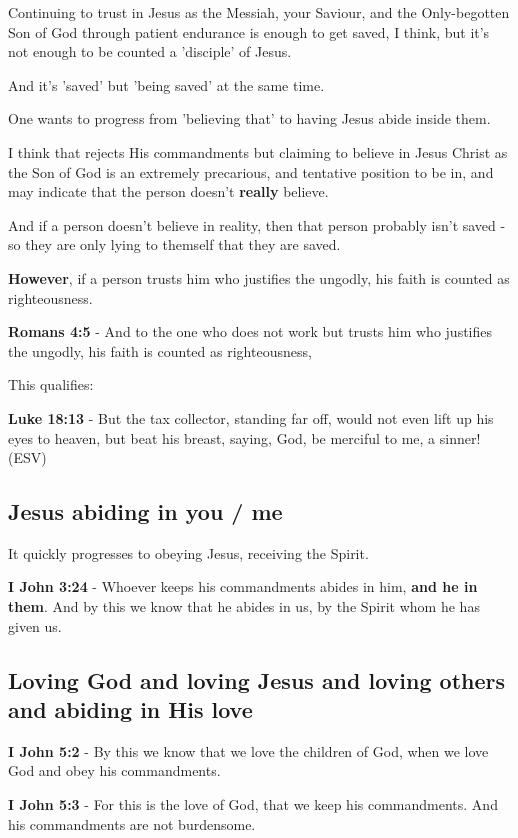 \documentclass[11pt]{article}
\begin{document}
Continuing to trust in Jesus as the Messiah, your Saviour, and the Only-begotten Son of God through patient endurance is enough to get saved, I think, but it's not enough to be counted a 'disciple' of Jesus.

And it's 'saved' but 'being saved' at the same time.

One wants to progress from 'believing that' to having Jesus abide inside them.

I think that rejects His commandments but claiming to believe in Jesus Christ as the Son of God is an extremely precarious, and tentative position to be in,
and may indicate that the person doesn't \textbf{really} believe.

And if a person doesn't believe in reality, then that person probably isn't saved - so they are only lying to themself that they are saved.

\textbf{However}, if a person trusts him who justifies the ungodly, his faith is counted as righteousness.

\textbf{Romans 4:5} - And to the one who does not work but trusts him who justifies the ungodly, his faith is counted as righteousness,

This qualifies:

\textbf{Luke 18:13} - But the tax collector, standing far off, would not even lift up his eyes to heaven, but beat his breast, saying, God, be merciful to me, a sinner! (ESV)

\subsection{Jesus abiding in \textbf{you} / \textbf{me}}
\label{sec:org6b030e6}
It quickly progresses to obeying Jesus, receiving the Spirit.

\textbf{I John 3:24} - Whoever keeps his commandments abides in him, \textbf{and he in them}. And by this we know that he abides in us, by the Spirit whom he has given us.

\subsection{Loving God and loving Jesus and loving others and abiding in His love}
\label{sec:orgc5fae0b}
\textbf{I John 5:2} - By this we know that we love the children of God, when we love God and obey his commandments.

\textbf{I John 5:3} - For this is the love of God, that we keep his commandments. And his commandments are not burdensome.
\end{document}
